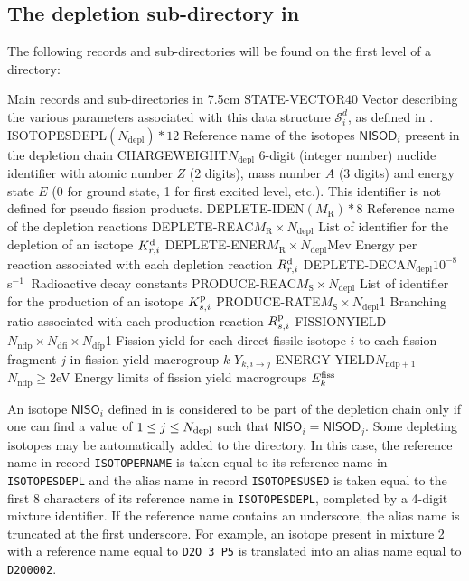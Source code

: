 \subsection{The depletion sub-directory  in
}\label{sect:microlibdirdepletion}

The following records and sub-directories will be found on the first level of a
 directory:

\begin{DescriptionEnregistrement}{Main records and sub-directories in
}{7.5cm}
\label{tabl:tabchain}
\IntEnr
  {STATE-VECTOR}{$40$}
  {Vector describing the various parameters associated with this data structure $\mathcal{S}^{d}_{i}$,
  as defined in .}
\CharEnr
  {ISOTOPESDEPL}{$(N_{\mathrm{depl}})*12$}
  {Reference name of the isotopes $\mathsf{NISOD}_{i}$ present in the depletion chain}
\IntEnr
  {CHARGEWEIGHT}{$N_{\mathrm{depl}}$}
  {6-digit (integer number) nuclide identifier with atomic number $Z$ (2
  digits), mass number $A$ (3 digits) and energy state $E$ (0 for ground state, 1
  for first excited level, etc.). This identifier is not defined for pseudo
  fission products.}
\CharEnr
  {DEPLETE-IDEN}{$(M_{\mathrm{R}})*8$}
  {Reference name of the depletion reactions}
\IntEnr
  {DEPLETE-REAC}{$M_{\mathrm{R}}\times N_{\mathrm{depl}}$}
  {List of identifier for the depletion of an isotope $K_{r,i}^{\rm d}$}
\RealEnr
  {DEPLETE-ENER}{$M_{\mathrm{R}}\times N_{\mathrm{depl}}$}{Mev}
  {Energy per reaction associated with each depletion reaction $R_{r,i}^{\rm d}$}
\RealEnr
  {DEPLETE-DECA}{$N_{\mathrm{depl}}$}{$10^{-8}$ s$^{-1}\ $}
  {Radioactive decay constants}
\IntEnr
  {PRODUCE-REAC}{$M_{\mathrm{S}}\times N_{\mathrm{depl}}$}
  {List of identifier for the production of an isotope $K_{s,i}^{\rm p}$}
\RealEnr
  {PRODUCE-RATE}{$M_{\mathrm{S}}\times N_{\mathrm{depl}}$}{1}
  {Branching ratio associated with each production reaction $R_{s,i}^{\rm p}$}
\RealEnr
  {FISSIONYIELD}{$N_{\mathrm{ndp}} \times N_{\mathrm{dfi}}\times N_{\mathrm{dfp}}$}{1}
  {Fission yield for each direct fissile isotope $i$ to each fission fragment $j$ in fission yield
  macrogroup $k$ $Y_{k,{i\to j}}$}
\OptRealEnr
  {ENERGY-YIELD}{$N_{\mathrm{ndp}+1}$}{$N_\mathrm{ndp}\ge 2$}{eV}
  {Energy limits of fission yield macrogroups $E_{k}^{\rm fiss}$}
\end{DescriptionEnregistrement}

An isotope $\mathsf{NISO}_{i}$ defined in  is considered
to be part of the depletion chain only if one can find a value of $1 \le j \le N_{\rm depl}$
such that $\mathsf{NISO}_{i}= \mathsf{NISOD}_{j}$.
Some depleting isotopes may be automatically added to the  directory.
In this case, the reference name in record {\tt ISOTOPERNAME} is taken equal
to its reference name in {\tt ISOTOPESDEPL} and the alias name in record
{\tt ISOTOPESUSED} is taken equal to the
first 8 characters of its reference name in {\tt ISOTOPESDEPL}, completed by a
4-digit mixture identifier. If the reference name contains an underscore, the
alias name is truncated at the first underscore. For example, an isotope
present in mixture 2 with a reference name equal to {\tt D2O\_3\_P5} is
translated into an alias name equal to {\tt D2O0002}.

